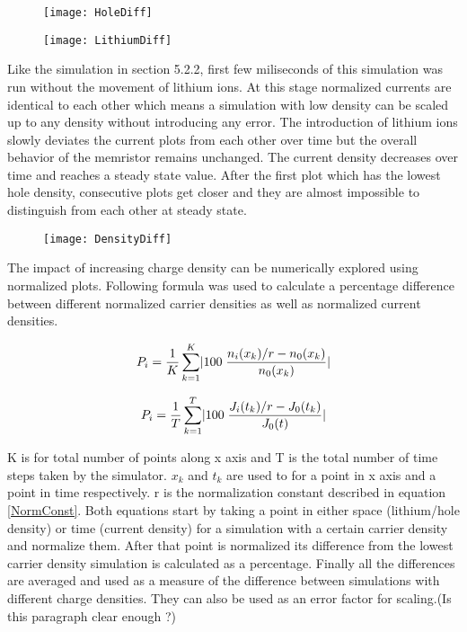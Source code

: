 \begin{doublespace}
\begin{figure}[!htp]
\centering
\texttt{[image: HoleDiff]}
\caption{} 
\label{HoleDiff}
\end{figure}

\begin{figure}[!htp]
\centering
\texttt{[image: LithiumDiff]}
\caption{} 
\label{LithiumDiff}
\end{figure}

Like the simulation in section 5.2.2, first few miliseconds of this simulation was run without the movement of lithium ions. At this stage normalized currents are identical to each other which means a simulation with low density can be scaled up to any density without introducing any error. The introduction of lithium ions slowly deviates the current plots from each other over time but the overall behavior of the memristor remains unchanged. The current density decreases over time and reaches a steady state value. After the first plot which has the lowest hole density, consecutive plots get closer and they are almost impossible to distinguish from each other at steady state.

\begin{figure}[!htp]
\centering
\texttt{[image: DensityDiff]}
\caption{} 
\label{DensityDiff}
\end{figure}

The impact of increasing charge density can be numerically explored using normalized plots. Following formula was used to calculate a percentage difference between different normalized carrier densities as well as normalized current densities. 


\begin{equation}
\centering
P_i = \frac{1}{ K}\sum_{k=1}^{K}\lvert 100 \;\frac{n_{i}(x_k)/r-n_{0}(x_k)}{n_{0}(x_k)}\rvert
\end{equation}

\begin{equation}
\centering
P_i = \frac{1}{ T}\sum_{k=1}^{T}\lvert 100 \;\frac{J_{i}(t_k)/r-J_{0}(t_k)}{J_{0}(t)}\rvert
\end{equation}


K is for total number of points along x axis and T is the total number of time steps taken by the simulator. $x_{k}$ and $t_{k}$ are used to for a point in x axis and a point in time respectively. r is the normalization constant described in equation \ref{NormConst}. Both equations start by taking a point in either space (lithium/hole density) or time (current density) for a simulation with a certain carrier density and normalize them. After that point is normalized its difference from the lowest carrier density simulation is calculated as a percentage. Finally all the differences are averaged and used as a measure of the difference between simulations with different charge densities. They can also be used as an error factor for scaling.(Is this paragraph clear enough ?)  


\end{doublespace}
